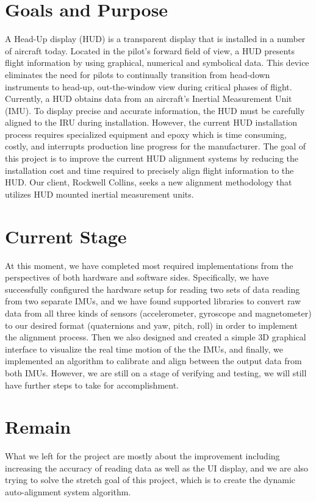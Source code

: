 \section{Goals and Purpose}
A Head-Up display (HUD) is a transparent display that is installed in a number of aircraft today. Located in the pilot’s forward field of view, a HUD presents flight information by using graphical, numerical and symbolical data. This device eliminates the need for pilots to continually transition from head-down instruments to head-up, out-the-window view during critical phases of flight. Currently, a HUD obtains data from an aircraft’s Inertial Measurement Unit (IMU). To display precise and accurate information, the HUD must be carefully aligned to the IRU during installation. However, the current HUD installation process requires specialized equipment and epoxy which is time consuming, costly, and interrupts production line progress for the manufacturer. The goal of this project is to improve the current HUD alignment systems by reducing the installation cost and time required to precisely align flight information to the HUD. Our client, Rockwell Collins, seeks a new alignment methodology that utilizes HUD mounted inertial measurement units.

\section{Current Stage}
At this moment, we have completed most required implementations from the perspectives of both hardware and software sides. Specifically, we have successfully configured the hardware setup for reading two sets of data reading from two separate IMUs, and we have found supported libraries to convert raw data from all three kinds of sensors (accelerometer, gyroscope and magnetometer) to our desired format (quaternions and yaw, pitch, roll) in order to implement the alignment process. Then we also designed and created a simple 3D graphical interface to visualize the real time motion of the the IMUs, and finally, we implemented an algorithm to calibrate and align between the output data from both IMUs. However, we are still on a stage of verifying and testing, we will still have further steps to take for accomplishment.

\section{Remain}
What we left for the project are mostly about the improvement including increasing the accuracy of reading data as well as the UI display, and we are also trying to solve the stretch goal of this project, which is to create the dynamic auto-alignment system algorithm. 

